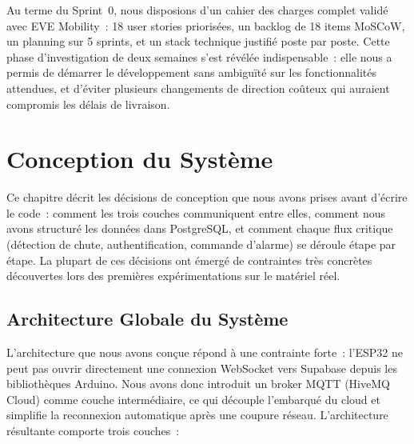 \documentclass[12pt, a4paper]{report}
\begin{document}
\begin{chapterconclusion}
Au terme du Sprint~0, nous disposions d'un cahier des charges complet validé avec EVE
Mobility~: 18 user stories priorisées, un backlog de 18 items MoSCoW, un planning sur
5 sprints, et un stack technique justifié poste par poste. Cette phase d'investigation
de deux semaines s'est révélée indispensable~: elle nous a permis de démarrer le
développement sans ambiguïté sur les fonctionnalités attendues, et d'éviter plusieurs
changements de direction coûteux qui auraient compromis les délais de livraison.
\end{chapterconclusion}

\chapter{Conception du Système}

\begin{chapterintro}
Ce chapitre décrit les décisions de conception que nous avons prises avant d'écrire
le code~: comment les trois couches communiquent entre elles, comment nous avons
structuré les données dans PostgreSQL, et comment chaque flux critique (détection de
chute, authentification, commande d'alarme) se déroule étape par étape. La plupart
de ces décisions ont émergé de contraintes très concrètes découvertes lors des
premières expérimentations sur le matériel réel.
\end{chapterintro}

\section{Architecture Globale du Système}

L'architecture que nous avons conçue répond à une contrainte forte~: l'ESP32 ne peut
pas ouvrir directement une connexion WebSocket vers Supabase depuis les bibliothèques
Arduino. Nous avons donc introduit un broker MQTT (HiveMQ Cloud) comme couche
intermédiaire, ce qui découple l'embarqué du cloud et simplifie la reconnexion
automatique après une coupure réseau. L'architecture résultante comporte trois couches~:
\end{document}
